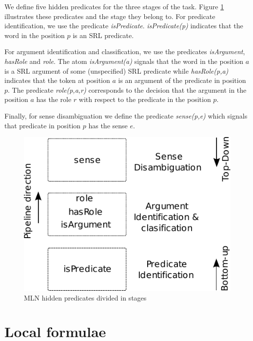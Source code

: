 

We define five hidden predicates for the three stages of the task. Figure \ref{fig:achitecture} illustrates these predicates and the stage they belong to. 
For predicate identification, we use the predicate \emph{isPredicate}. \emph{isPredicate(p)} indicates that the word in the position $p$ is an SRL predicate.

For argument identification and classification, we use the predicates \emph{isArgument}, \emph{hasRole} and \emph{role}. The atom \emph{isArgument(a)} signals that the word in the position $a$ is a SRL argument of some (unspecified) SRL predicate while \emph{hasRole(p,a)} indicates that the token at position $a$ is an argument of the predicate in position $p$. The predicate \emph{role(p,a,r)} corresponds to the decision that the argument in the position $a$ has the role $r$ with respect to the predicate in the position $p$.

Finally, for sense disambiguation we  define the predicate \emph{sense(p,e)} which signals that predicate in position $p$ has the sense $e$. 

\begin{figure}
\begin{center}
    \includegraphics[scale=.70]{TaskArchitecture}
\end{center}
\caption{MLN hidden predicates divided in stages}
\label{fig:achitecture}
\end{figure}

\section{Local formulae}

